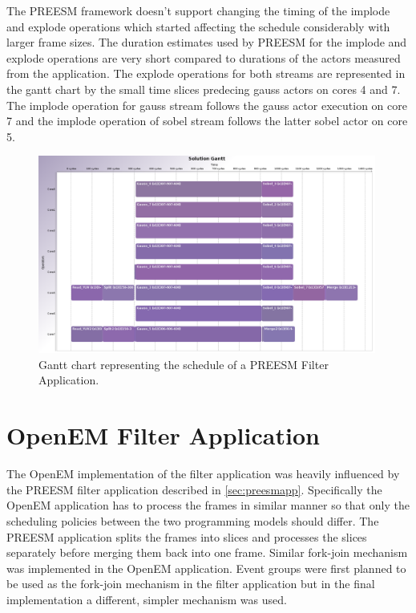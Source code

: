 The PREESM framework doesn't support changing the timing of the implode and
explode operations which started affecting the schedule considerably with larger
frame sizes. The duration estimates used by PREESM for the implode and explode
operations are very short compared to durations of the actors measured from the
application. The explode operations for both streams are represented in the
gantt chart by the small time slices predecing gauss actors on cores 4 and 7.
The implode operation for gauss stream follows the gauss actor execution on core
7 and the implode operation of sobel stream follows the latter sobel actor on
core 5.

\begin{figure}[h!] \label{fig:preesm_gantt} \begin{center}
    \includegraphics[width=0.99\textwidth]{images/gantt_preesm_cifcif.png}
    \caption{Gantt chart representing the schedule of a PREESM Filter
    Application.} \end{center}
\end{figure}

\section{OpenEM Filter Application}
The OpenEM implementation of the filter application was heavily influenced by
the PREESM filter application described in \ref{sec:preesmapp}. Specifically the
OpenEM application has to process the frames in similar manner so that only the
scheduling policies between the two programming models should differ. The PREESM
application splits the frames into slices and processes the slices separately
before merging them back into one frame. Similar fork-join mechanism was
implemented in the OpenEM application. Event groups were first planned to be
used as the fork-join mechanism in the filter application but in the final
implementation a different, simpler mechanism was used.

